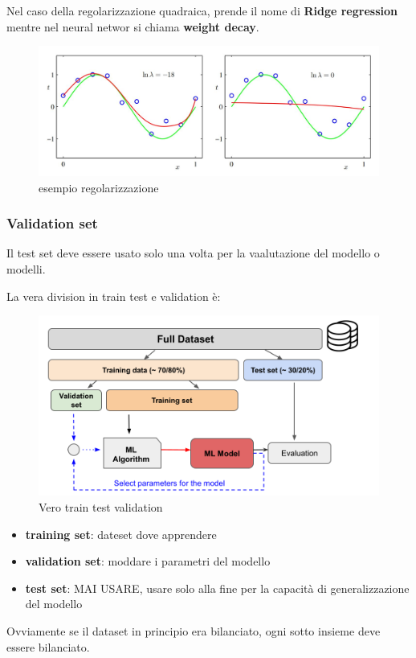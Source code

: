 Nel caso della regolarizzazione quadraica, prende il nome di \textbf{Ridge regression}
mentre nel neural networ si chiama \textbf{weight decay}.

\begin{figure}[H]
    \centering
    \includegraphics[width=0.5\linewidth]{imgs/esempio-lambda-regolarizzzazione}
    \caption{esempio regolarizzazione}
    \label{fig:esempio_lambda}
\end{figure}


\subsubsection{Validation set}
Il test set deve essere usato solo una volta per la vaalutazione del modello
 o modelli.

La vera division in train test e validation è:

\begin{figure}[H]
    \centering
    \includegraphics[width=0.65\linewidth]{imgs/train-test-validation}
    \caption{Vero train test validation}
    \label{fig:train_test_val}
\end{figure}
\begin{itemize}
    \item \textbf{training set}: dateset dove apprendere
    \item \textbf{validation set}: moddare i parametri del modello
    \item \textbf{test set}: MAI USARE, usare solo alla fine per la capacità
    di generalizzazione del modello
\end{itemize}

Ovviamente se il dataset in principio era bilanciato, ogni sotto insieme deve
essere bilanciato.











